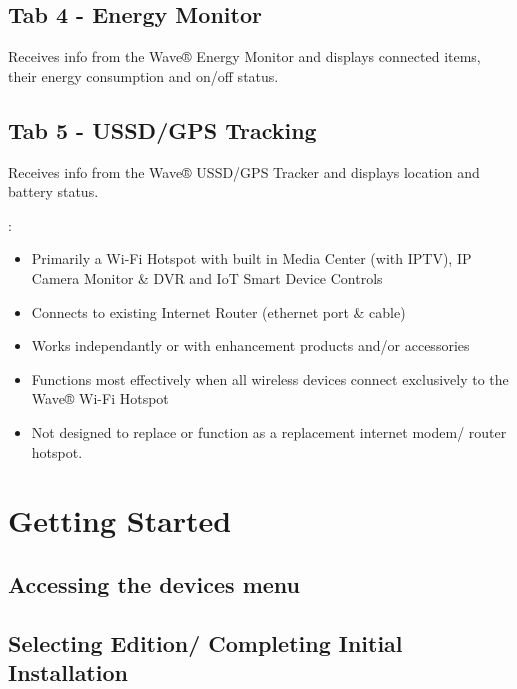 \documentclass[letterpaper,10pt,english]{sphinxmanual}
\begin{document}
\subsection{Tab 4 - Energy Monitor}
\label{\detokenize{introduction:tab-4-energy-monitor}}
Receives info from the Wave® Energy Monitor and displays connected items, their energy consumption and on/off status.


\subsection{Tab 5 - USSD/GPS Tracking}
\label{\detokenize{introduction:tab-5-ussd-gps-tracking}}
Receives info from the  Wave® USSD/GPS Tracker and displays location and battery status.

:
\begin{itemize}
\item {} 
Primarily a Wi-Fi Hotspot with built in Media Center (with IPTV), IP Camera Monitor \& DVR and IoT Smart Device Controls

\item {} 
Connects to existing Internet Router (ethernet port \& cable)

\item {} 
Works independantly or with enhancement products and/or accessories

\item {} 
Functions most effectively when all wireless devices connect exclusively to the Wave® Wi-Fi Hotspot

\item {} 
Not designed to replace or function as a replacement internet modem/ router hotspot.

\end{itemize}


\section{Getting Started}
\label{\detokenize{introduction:getting-started}}

\subsection{Accessing the devices menu}
\label{\detokenize{introduction:accessing-the-devices-menu}}

\subsection{Selecting Edition/ Completing Initial Installation}
\label{\detokenize{introduction:selecting-edition-completing-initial-installation}}
\end{document}
